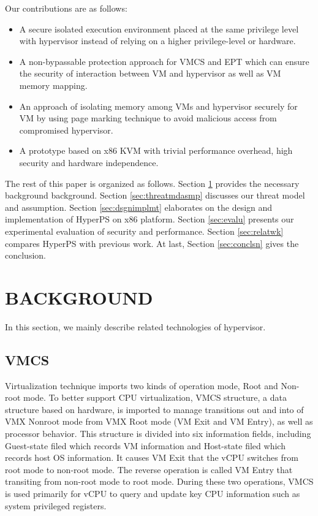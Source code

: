 \documentclass[10pt, numbers, preprint ]{sigplanconf}
\begin{document}
{%
Our contributions are as follows:
\begin{itemize}
\item A secure isolated execution environment placed at the same privilege level with hypervisor instead of relying on a higher privilege-level or hardware.
\item A non-bypassable protection approach for VMCS and EPT which can ensure the security of interaction between VM and hypervisor as well as VM memory mapping.
\item An approach of isolating memory among VMs and hypervisor securely for VM by using page marking technique to avoid malicious access from compromised hypervisor.
\item A prototype based on x86 KVM with trivial performance overhead, high security and hardware independence.
\end{itemize}

The rest of this paper is organized as follows. Section \ref{sec:bkground} provides the necessary background background. Section \ref{sec:threatmdasmp} discusses our threat model and assumption. Section \ref{sec:dsgnimplmt} elaborates on the design and implementation of HyperPS on x86 platform. Section \ref{sec:evalu} presents our experimental evaluation of security and performance. Section \ref{sec:relatwk} compares HyperPS with previous work. At last, Section \ref{sec:conclsn} gives the conclusion.

\section{BACKGROUND} \label{sec:bkground}
In this section, we mainly describe related technologies of hypervisor.

\subsection{VMCS} \label{subsec:vmcs}
Virtualization technique imports two kinds of operation mode, Root and Non-root mode. To better support CPU virtualization, VMCS structure, a data structure based on hardware, is imported to manage transitions out and into of VMX Nonroot mode from VMX Root mode (VM Exit and VM Entry), as well as processor behavior. This structure is divided into six information fields, including Guest-state filed which records VM information and Host-state filed which records host OS information. It causes VM Exit that the vCPU switches from root mode to non-root mode. The reverse operation is called VM Entry that transiting from non-root mode to root mode. During these two operations, VMCS is used primarily for vCPU to query and update key CPU information such as system privileged registers.

}
\end{document}
